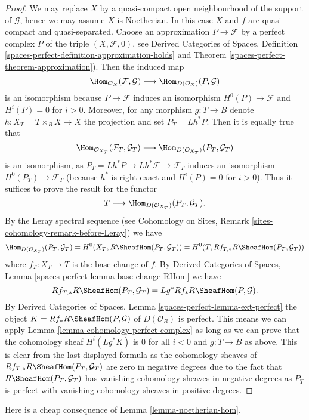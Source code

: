 \begin{proof}
We may replace $X$ by a quasi-compact open neighbourhood of
the support of $\mathcal{G}$, hence we may assume $X$ is Noetherian.
In this case $X$ and $f$ are quasi-compact and quasi-separated.
Choose an approximation $P \to \mathcal{F}$ by a perfect complex $P$ of
the triple $(X, \mathcal{F}, 0)$, see
Derived Categories of Spaces, Definition
\ref{spaces-perfect-definition-approximation-holds} and
Theorem \ref{spaces-perfect-theorem-approximation}).
Then the induced map
$$
\Hom_{\mathcal{O}_X}(\mathcal{F}, \mathcal{G})
\longrightarrow
\Hom_{D(\mathcal{O}_X)}(P, \mathcal{G})
$$
is an isomorphism because $P \to \mathcal{F}$ induces an isomorphism
$H^0(P) \to \mathcal{F}$ and $H^i(P) = 0$ for $i > 0$.
Moreover, for any morphism $g : T \to B$
denote $h : X_T = T \times_B X \to X$ the projection and set
$P_T = Lh^*P$. Then it is equally true that
$$
\Hom_{\mathcal{O}_{X_T}}(\mathcal{F}_T, \mathcal{G}_T)
\longrightarrow
\Hom_{D(\mathcal{O}_{X_T})}(P_T, \mathcal{G}_T)
$$
is an isomorphism, as $P_T = Lh^*P \to Lh^*\mathcal{F} \to \mathcal{F}_T$
induces an isomorphism $H^0(P_T) \to \mathcal{F}_T$ (because $h^*$ is
right exact and $H^i(P) = 0$ for $i > 0$). Thus it suffices to prove the
result for the functor
$$
T \longmapsto \Hom_{D(\mathcal{O}_{X_T})}(P_T, \mathcal{G}_T).
$$
By the Leray spectral sequence (see Cohomology on Sites, Remark
\ref{sites-cohomology-remark-before-Leray}) we have
$$
\Hom_{D(\mathcal{O}_{X_T})}(P_T, \mathcal{G}_T) =
H^0(X_T, R\SheafHom(P_T, \mathcal{G}_T)) =
H^0(T, Rf_{T, *}R\SheafHom(P_T, \mathcal{G}_T))
$$
where $f_T : X_T \to T$ is the base change of $f$. By
Derived Categories of Spaces, Lemma
\ref{spaces-perfect-lemma-base-change-RHom}
we have
$$
Rf_{T, *}R\SheafHom(P_T, \mathcal{G}_T) = Lg^*Rf_*R\SheafHom(P, \mathcal{G}).
$$
By
Derived Categories of Spaces, Lemma
\ref{spaces-perfect-lemma-ext-perfect}
the object $K = Rf_*R\SheafHom(P, \mathcal{G})$ of $D(\mathcal{O}_B)$
is perfect. This means we can apply
Lemma \ref{lemma-cohomology-perfect-complex}
as long as we can prove that the cohomology sheaf
$H^i(Lg^*K)$ is $0$ for all $i < 0$ and $g : T \to B$ as above.
This is clear from the last displayed formula as
the cohomology sheaves of
$Rf_{T, *}R\SheafHom(P_T, \mathcal{G}_T)$
are zero in negative degrees
due to the fact that $R\SheafHom(P_T, \mathcal{G}_T)$ has vanishing
cohomology sheaves in negative degrees as $P_T$ is perfect with
vanishing cohomology sheaves in positive degrees.
\end{proof}

\noindent
Here is a cheap consequence of Lemma \ref{lemma-noetherian-hom}.

